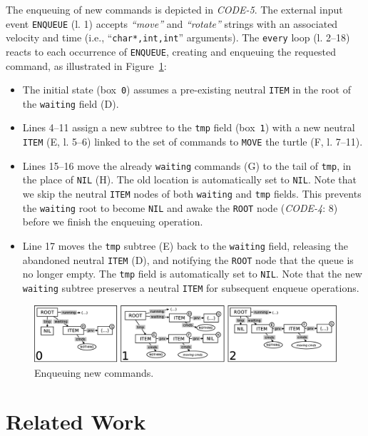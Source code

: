 \documentclass{sig-alternate}
\newcommand{\code}[1] {{\small{\texttt{#1}}}}
\newcommand{\MM}[1] {\textcircled{\tiny{\textsf{#1}}}}
\begin{document}
The enqueuing of new commands is depicted in \emph{CODE-5}.
The external input event \code{ENQUEUE} (l. 1) accepts \emph{``move''} and 
\emph{``rotate''} strings with an associated velocity and time (i.e., 
``\code{char*,int,int}'' arguments).
The \code{every} loop (l. 2--18) reacts to each occurrence of 
\code{ENQUEUE}, creating and enqueuing the requested command, as illustrated in 
Figure~\ref{fig.queue-2}: 
%
\begin{itemize}
%
\item The initial state (box~\code{0}) assumes a pre-existing neutral 
\code{ITEM} in the root of the \code{waiting} field (\MM{D}).
%
\item Lines 4--11 assign a new subtree to the \code{tmp} field (box~\code{1}) 
with a new neutral \code{ITEM} (\MM{E}, l. 5--6) linked to the set of 
commands to \code{MOVE} the turtle (\MM{F}, l. 7--11).
%
\item Lines 15--16 move the already \code{waiting} commands (\MM{G}) to the 
tail of \code{tmp}, in the place of \code{NIL} (\MM{H}).
The old location is automatically set to \code{NIL}.
Note that we skip the neutral \code{ITEM} nodes of both \code{waiting} and 
\code{tmp} fields.
This prevents the \code{waiting} root to become \code{NIL} and awake the 
\code{ROOT} node (\emph{CODE-4}: 8) before we finish the enqueuing operation.
%
\item Line 17 moves the \code{tmp} subtree (\MM{E}) back to the \code{waiting} 
field, releasing the abandoned neutral \code{ITEM} (\MM{D}), and notifying the 
\code{ROOT} node that the queue is no longer empty.
The \code{tmp} field is automatically set to \code{NIL}.
Note that the new \code{waiting} subtree preserves a neutral \code{ITEM} for 
subsequent enqueue operations.
%
\end{itemize}

\begin{figure}[t]
\centering
\includegraphics[scale=0.24]{queue-fig-2.eps}
\caption{
Enqueuing new commands.
\label{fig.queue-2}
}
\end{figure}

\section{Related Work}
\label{sec.related}
\end{document}
